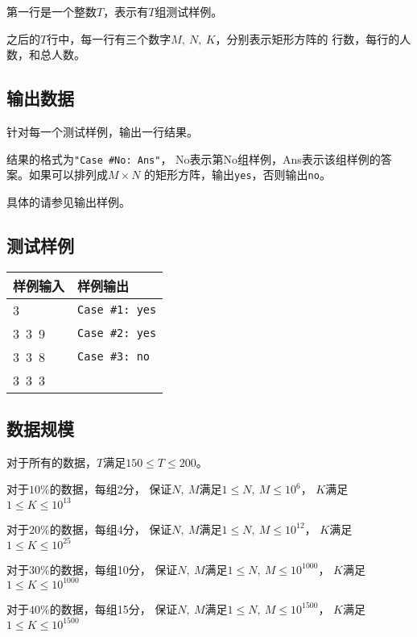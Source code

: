 \documentclass{article}
\begin{document}
第一行是一个整数$T$，表示有$T$组测试样例。

之后的$T$行中，每一行有三个数字$M,\ N,\ K$，分别表示矩形方阵的
行数，每行的人数，和总人数。

\subsection*{输出数据}
针对每一个测试样例，输出一行结果。

结果的格式为{\tt "Case \#No: Ans"}，
No表示第No组样例，Ans表示该组样例的答案。如果可以排列成$M \times N$
的矩形方阵，输出{\tt yes}，否则输出{\tt no}。

具体的请参见输出样例。

\subsection*{测试样例}
\begin{flushleft}
\begin{tabular}{|p{6cm}|p{6cm}|}
 \hline \bfseries{样例输入} & \bfseries{样例输出} \\
 \hline 
    3 & {\tt Case \#1: yes} \\
    3\ 3\ 9 & {\tt Case \#2: yes} \\
    3\ 3\ 8 & {\tt Case \#3: no} \\
    3\ 3\ 3 & \\
 \hline 
\end{tabular}
\end{flushleft}

\subsection*{数据规模}
对于所有的数据，$T$满足$150 \leq T \leq 200$。

对于$10\%$的数据，每组2分，
保证$N,\ M$满足$1 \leq N,\ M \leq 10^{6}$，
$K$满足$1 \leq K \leq 10^{13}$


对于$20\%$的数据，每组4分，
保证$N,\ M$满足$1 \leq N,\ M \leq 10^{12}$，
$K$满足$1 \leq K \leq 10^{25}$


对于$30\%$的数据，每组10分，
保证$N,\ M$满足$1 \leq N,\ M \leq 10^{1000}$，
$K$满足$1 \leq K \leq 10^{1000}$


对于$40\%$的数据，每组15分，
保证$N,\ M$满足$1 \leq N,\ M \leq 10^{1500}$，
$K$满足$1 \leq K \leq 10^{1500}$

\clearpage



\end{document}
